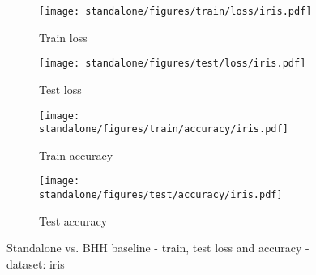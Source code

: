 \begin{figure}[htbp]
      \begin{subfigure}{0.5\textwidth}
            \centering
            \texttt{[image: standalone/figures/train/loss/iris.pdf]}
            \caption{Train loss}
            \label{fig:results:standalone:figures:loss:train:iris}
      \end{subfigure}
      \begin{subfigure}{0.5\textwidth}
            \centering
            \texttt{[image: standalone/figures/test/loss/iris.pdf]}
            \caption{Test loss}
            \label{fig:results:standalone:figures:loss:test:iris}
      \end{subfigure}
      \par\bigskip
      \begin{subfigure}{0.5\textwidth}
            \centering
            \texttt{[image: standalone/figures/train/accuracy/iris.pdf]}
            \caption{Train accuracy}
            \label{fig:results:standalone:figures:accuracy:train:iris}
      \end{subfigure}
      \begin{subfigure}{0.5\textwidth}
            \centering
            \texttt{[image: standalone/figures/test/accuracy/iris.pdf]}
            \caption{Test accuracy}
            \label{fig:results:standalone:figures:accuracy:test:iris}
      \end{subfigure}
      \par\bigskip
      \caption{Standalone vs. \Acs{BHH} baseline - train, test loss and accuracy - dataset: iris}
      \label{fig:results:standalone:figures:iris}
\end{figure}

